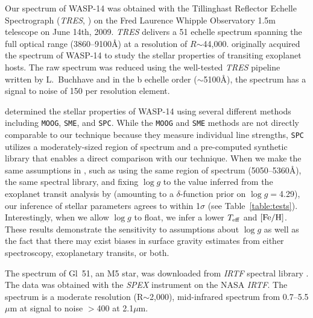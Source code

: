 \documentclass[iop,floatfix]{emulateapj}
\newcommand{\Z}{[{\rm Fe}/{\rm H}]}
\begin{document}
Our spectrum of WASP-14 was obtained with the Tillinghast Reflector Echelle Spectrograph (\emph{TRES}, \citealt{mink11}) on the Fred Laurence Whipple Observatory 1.5m telescope on June 14th, 2009. \emph{TRES} delivers a 51 echelle spectrum spanning the full optical range (3860--9100\AA) at a resolution of $R$$\sim$44,000. \citet{torres12} originally acquired the spectrum of WASP-14 to study the stellar properties of transiting exoplanet hosts. The raw spectrum was reduced using the well-tested \emph{TRES} pipeline written by L.~Buchhave and in the b echelle order ($\sim$5100\AA), the spectrum has a signal to noise of 150 per resolution element.

\citet{torres12} determined the stellar properties of WASP-14 using several different methods including {\tt MOOG}, {\tt SME}, and {\tt SPC}. While the {\tt MOOG} and {\tt SME} methods are not directly comparable to our technique because they measure individual line strengths, {\tt SPC} utilizes a moderately-sized region of spectrum and a pre-computed synthetic library that enables a direct comparison with our technique. When we make the same assumptions in \citet{torres12}, such as using the same region of spectrum (5050--5360\AA), the same spectral library, and fixing $\log g$ to the value inferred from the exoplanet transit analysis by \citet{joshi09} (amounting to a $\delta$-function prior on $\log g$$=$4.29), our inference of stellar parameters agrees to within 1$\sigma$ (see Table~\ref{table:tests}). Interestingly, when we allow $\log g$ to float, we infer a lower $T_{\rm eff}$ and $\Z$. These results demonstrate the sensitivity to assumptions about $\log g$ as well as the fact that there may exist biases in surface gravity estimates from either spectroscopy, exoplanetary transits, or both. 

The spectrum of Gl~51, an M5 star, was downloaded from \emph{IRTF} spectral library \citep{cushing05, rayner09}. The data was obtained with the \emph{SPEX} instrument \citep{rayner03} on the NASA \emph{IRTF}. The spectrum is a moderate resolution (R$\sim$2,000), mid-infrared spectrum from 0.7--5.5$\mu$m at signal to noise $>$400 at 2.1$\mu$m.
\end{document}
